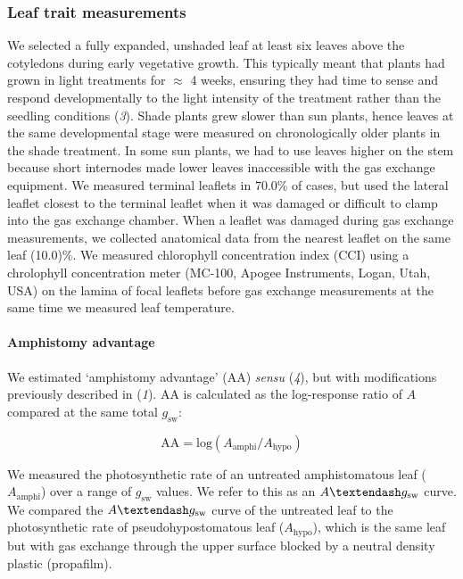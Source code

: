 \documentclass[
  letterpaper,
  DIV=11,
  numbers=noendperiod]{scrartcl}
\let\oldparagraph\paragraph
\renewcommand{\paragraph}[1]{\oldparagraph{#1}\mbox{}}
\newcommand{\aax}{$\mathrm{AA}$}
\newcommand{\Aamphi}{$A_{\mathrm{amphi}}$}
\newcommand{\Ahypo}{$A_{\mathrm{hypo}}$}
\newcommand{\agcurve}{$A \textendash g_\text{sw}$}
\newcommand{\gsw}{$g_\text{sw}$}
\begin{document}
\subsubsection{Leaf trait measurements}\label{leaf-trait-measurements}

We selected a fully expanded, unshaded leaf at least six leaves above
the cotyledons during early vegetative growth. This typically meant that
plants had grown in light treatments for \(\approx\) 4 weeks, ensuring
they had time to sense and respond developmentally to the light
intensity of the treatment rather than the seedling conditions
(\emph{3}). Shade plants grew slower than sun plants, hence leaves at
the same developmental stage were measured on chronologically older
plants in the shade treatment. In some sun plants, we had to use leaves
higher on the stem because short internodes made lower leaves
inaccessible with the gas exchange equipment. We measured terminal
leaflets in 70.0\% of cases, but used the lateral leaflet closest to the
terminal leaflet when it was damaged or difficult to clamp into the gas
exchange chamber. When a leaflet was damaged during gas exchange
measurements, we collected anatomical data from the nearest leaflet on
the same leaf (10.0)\%. We measured chlorophyll concentration index
(CCI) using a chrolophyll concentration meter (MC-100, Apogee
Instruments, Logan, Utah, USA) on the lamina of focal leaflets before
gas exchange measurements at the same time we measured leaf temperature.

\paragraph{Amphistomy advantage}\label{amphistomy-advantage}

We estimated `amphistomy advantage' (\aax) \emph{sensu} (\emph{4}), but
with modifications previously described in (\emph{1}). \aax{} is
calculated as the log-response ratio of \(A\) compared at the same total
\gsw:

\[\mathrm{AA} = \mathrm{log}(A_{\mathrm{amphi}} / A_{\mathrm{hypo}})\]

We measured the photosynthetic rate of an untreated amphistomatous leaf
(\Aamphi) over a range of \gsw{} values. We refer to this as an
\agcurve{} curve. We compared the \agcurve{} curve of the untreated leaf
to the photosynthetic rate of pseudohypostomatous leaf (\Ahypo), which
is the same leaf but with gas exchange through the upper surface blocked
by a neutral density plastic (propafilm).
\end{document}
